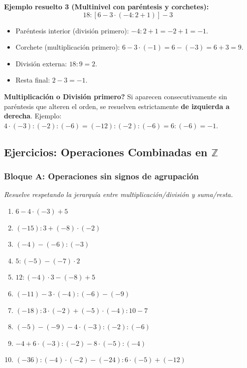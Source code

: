\documentclass[12pt, letterpaper]{article}
\newcommand{\Z}{\mathbb{Z}}
\begin{document}
\noindent\textbf{Ejemplo resuelto 3 (Multinivel con paréntesis y corchetes):}
\[
  18 : [6 - 3 \cdot (-4 : 2 + 1)] - 3
\]
\begin{itemize}
  \item Paréntesis interior (división primero): $-4 : 2 + 1 = -2 + 1 = -1$.
  \item Corchete (multiplicación primero): $6 - 3 \cdot (-1) = 6 - (-3) = 6 + 3 = 9$.
  \item División externa: $18 : 9 = 2$.
  \item Resta final: $2 - 3 = -1$.
\end{itemize}

\begin{cuadroadvertencia}
  \textbf{\textquestiondown Multiplicación o División primero?} Si aparecen consecutivamente sin paréntesis que alteren el orden, se resuelven estrictamente \textbf{de izquierda a derecha}. Ejemplo: $4 \cdot (-3) : (-2) : (-6) = (-12) : (-2) : (-6) = 6 : (-6) = -1$.
\end{cuadroadvertencia}

\subsection{Ejercicios: Operaciones Combinadas en $\Z$}

\subsubsection*{Bloque A: Operaciones sin signos de agrupación}
\textit{Resuelve respetando la jerarquía entre multiplicación/división y suma/resta.}

\begin{enumerate}[leftmargin=*, start=94]
  \item \facil{} $6 - 4 \cdot (-3) + 5$

  \item \facil{} $(-15) : 3 + (-8) \cdot (-2)$

  \item \medio{} $(-4) - (-6) : (-3)$

  \item \medio{} $5 : (-5) - (-7) \cdot 2$

  \item \medio{} $12 : (-4) \cdot 3 - (-8) + 5$

  \item \medio{} $(-11) - 3 \cdot (-4) : (-6) - (-9)$

  \item \dificil{} $(-18) : 3 \cdot (-2) + (-5) \cdot (-4) : 10 - 7$

  \item \dificil{} $(-5) - (-9) - 4 \cdot (-3) : (-2) : (-6)$

  \item \dificil{} $-4 + 6 \cdot (-3) : (-2) - 8 \cdot (-5) : (-4)$

  \item \dificil{} $(-36) : (-4) \cdot (-2) - (-24) : 6 \cdot (-5) + (-12)$
\end{enumerate}
\end{document}
